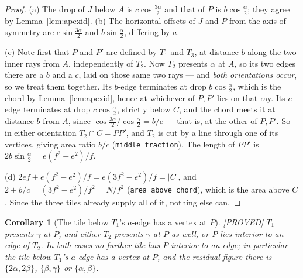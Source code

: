 \documentclass[11pt,reqno]{amsart}
\theoremstyle{plain}
\newtheorem{corollary}[theorem]{Corollary}
\theoremstyle{definition}
\newcommand{\lab}[1]{\hfill\textnormal{\footnotesize\textsc{[#1]}}}
\begin{document}
\begin{proof}
(a) The drop of $J$ below $A$ is $c\cos\frac{3\alpha}{2}$ and that of $P$ is $b\cos\frac{\alpha}{2}$;
they agree by Lemma~\ref{lem:apexid}. (b) The horizontal offsets of $J$ and $P$ from the axis of
symmetry are $c\sin\frac{3\alpha}{2}$ and $b\sin\frac{\alpha}{2}$, differing by $a$.

(c) Note first that $P$ and $P'$ are defined by $T_1$ and $T_3$, at distance $b$ along the two inner
rays from $A$, independently of $T_2$. Now $T_2$ presents $\alpha$ at $A$, so its two edges there are a
$b$ and a $c$, laid on those same two rays --- and \emph{both orientations occur}, so we treat them
together. Its $b$-edge terminates at drop $b\cos\frac{\alpha}{2}$, which is the chord by
Lemma~\ref{lem:apexid}, hence at whichever of $P,P'$ lies on that ray. Its $c$-edge terminates at drop
$c\cos\frac{\alpha}{2}$, strictly below $C$, and the chord meets it at distance $b$ from $A$, since
$\cos\frac{3\alpha}{2}/\cos\frac{\alpha}{2}=b/c$ --- that is, at the other of $P,P'$. So in either
orientation $T_2\cap C=PP'$, and $T_2$ is cut by a line through one of its vertices, giving area ratio
$b/c$ (\texttt{middle\_fraction}). The length of $PP'$ is $2b\sin\frac{\alpha}{2}=e(f^{2}-e^{2})/f$.

(d) $2ef+e(f^{2}-e^{2})/f=e(3f^{2}-e^{2})/f=|C|$, and $2+b/c=(3f^{2}-e^{2})/f^{2}=N/f^{2}$
(\texttt{area\_above\_chord}), which is the area above $C$. Since the three tiles already supply all of
it, nothing else can.
\end{proof}

\begin{corollary}[The tile below $T_1$'s $a$-edge has a vertex at $P$]\label{cor:noTP}\lab{PROVED}
$T_1$ presents $\gamma$ at $P$, and either $T_2$ presents $\gamma$ at $P$ as well, or $P$ lies interior
to an edge of $T_2$. In both cases no \emph{further} tile has $P$ interior to an edge; in particular
the tile below $T_1$'s $a$-edge has a vertex at $P$, and the residual figure there is
$\{2\alpha,2\beta\}$, $\{\beta,\gamma\}$ or $\{\alpha,\beta\}$.
\end{corollary}
\end{document}
